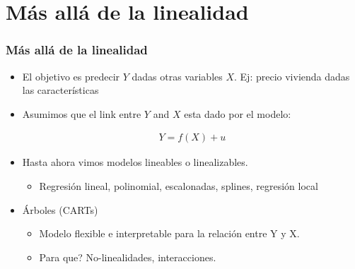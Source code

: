 \documentclass[
  shownotes,
  xcolor={svgnames},
  hyperref={colorlinks,citecolor=DarkBlue,linkcolor=DarkRed,urlcolor=DarkBlue}
  , aspectratio=169]{beamer}
\begin{document}
\section{Más allá de la linealidad}
\begin{frame}
\frametitle{Más allá de la linealidad}


    \begin{itemize}
      \item El objetivo es predecir $Y$ dadas otras variables $X$. Ej: precio vivienda dadas las características
      \bigskip
      \item Asumimos que el link entre $Y$ and $X$ esta dado por el modelo:

        \bigskip
        \begin{align}
          Y = f(X) + u
        \end{align}

    \item Hasta ahora vimos modelos lineables o linealizables.
    \begin{itemize}
      \item Regresión lineal, polinomial, escalonadas, splines, regresión local
    \end{itemize}


  \item Árboles (CARTs) 
  \begin{itemize}
    \item Modelo flexible e interpretable para la relación entre Y y X.
    \item Para que? No-linealidades,  interacciones.
  \end{itemize}
    
 
\end{itemize}


\end{frame}
\end{document}
